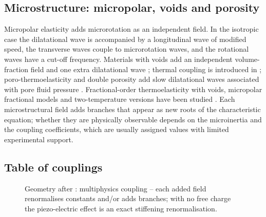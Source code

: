 \subsection{Microstructure: micropolar, voids and porosity}
Micropolar elasticity \citep{Eringen1966a,Eringen1999,TauchertClausAriman1968} adds microrotation as an independent field. In the isotropic case the dilatational wave is accompanied by a longitudinal wave of modified speed, the transverse waves couple to microrotation waves, and the rotational waves have a cut-off frequency. Materials with voids add an independent volume-fraction field \citep{Nunziato1979,Cowin1983,Iesan1986} and one extra dilatational wave \citep{Cowin1983}; thermal coupling is introduced in \citep{Iesan1986}; poro-thermoelasticity and double porosity add slow dilatational waves associated with pore fluid pressure \citep{Singh2020,Kumar2022,Kumar2025}. Fractional-order thermoelasticity with voids, micropolar fractional models and two-temperature versions have been studied \citep{Bachher2019,Sharma2022,Biswas2020a,Kalkal2020,Kumar2008,Kumar2018}. Each microstructural field adds branches that appear as new roots of the characteristic equation; whether they are physically observable depends on the microinertia and the coupling coefficients, which are usually assigned values with limited experimental support.

\subsection{Table of couplings}
\begin{figure}[t!]\centering\small

\caption{Geometry after \citep{Nowacki1978,Chandrasekharaiah1984}: multiphysics coupling -- each added field renormalises constants and/or adds branches; with no free charge the piezo-electric effect is an exact stiffening renormalisation.}\label{fig:multi-geo}
\end{figure}

